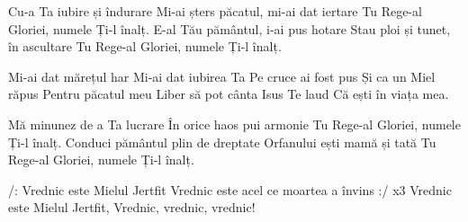 

\beginverse
Cu-a Ta iubire și îndurare
Mi-ai șters păcatul, mi-ai dat iertare
Tu Rege-al Gloriei, numele Ți-l înalț.
E-al Tău pământul, i-ai pus hotare
Stau ploi și tunet, în ascultare
Tu Rege-al Gloriei, numele Ți-l înalț.
\endverse

\beginchorus
Mi-ai dat mărețul har
Mi-ai dat iubirea Ta
Pe cruce ai fost pus
Și ca un Miel răpus
Pentru păcatul meu
Liber să pot cânta
Isus Te laud
Că ești în viața mea.
\endchorus

\beginverse
Mă minunez de a Ta lucrare
În orice haos pui armonie
Tu Rege-al Gloriei, numele Ți-l înalț.
Conduci pământul plin de dreptate
Orfanului ești mamă și tată
Tu Rege-al Gloriei, numele Ți-l înalț.
\endverse

\beginverse
/: Vrednic este Mielul Jertfit
Vrednic este acel ce moartea a învins :/ x3
Vrednic este Mielul Jertfit,
Vrednic, vrednic, vrednic!
\endverse


\endsong
